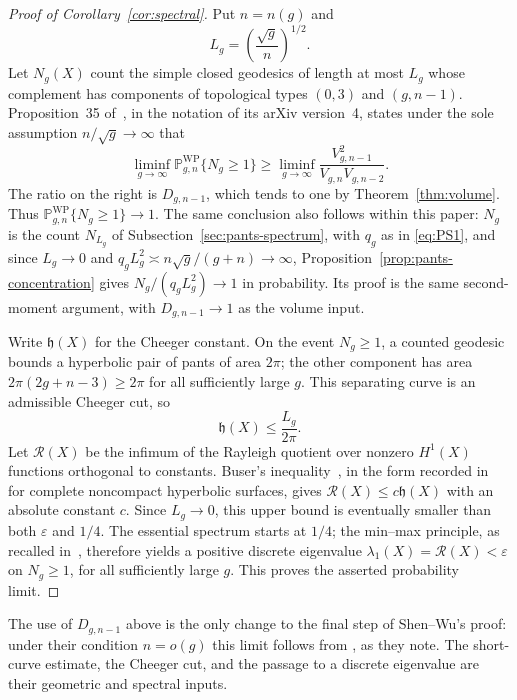 \begin{proof}[Proof of Corollary~\ref{cor:spectral}]
Put $n=n(g)$ and
\[
 L_g=\left(\frac{\sqrt g}{n}\right)^{1/2}.
\]
Let $N_g(X)$ count the simple closed geodesics of length at most $L_g$ whose complement has components of topological types $(0,3)$ and $(g,n-1)$. Proposition~35 of~\cite{SW}, in the notation of its arXiv version~4, states under the sole assumption $n/\sqrt g\to\infty$ that
\[
 \liminf_{g\to\infty}\mathbb P^{\mathrm{WP}}_{g,n}\{N_g\ge1\}
 \ge \liminf_{g\to\infty}
 \frac{V_{g,n-1}^{2}}{V_{g,n}V_{g,n-2}}.
\]
The ratio on the right is $D_{g,n-1}$, which tends to one by Theorem~\ref{thm:volume}. Thus $\mathbb P^{\mathrm{WP}}_{g,n}\{N_g\ge1\}\to1$. The same conclusion also follows within this paper: $N_g$ is the count $N_{L_g}$ of Subsection~\ref{sec:pants-spectrum}, with $q_g$ as in \eqref{eq:PS1}, and since $L_g\to0$ and $q_gL_g^2\asymp n\sqrt g/(g+n)\to\infty$, Proposition~\ref{prop:pants-concentration} gives $N_g/(q_gL_g^2)\to1$ in probability. Its proof is the same second-moment argument, with $D_{g,n-1}\to1$ as the volume input.

Write $\mathfrak h(X)$ for the Cheeger constant. On the event $N_g\ge1$, a counted geodesic bounds a hyperbolic pair of pants of area $2\pi$; the other component has area $2\pi(2g+n-3)\ge2\pi$ for all sufficiently large $g$. This separating curve is an admissible Cheeger cut, so
\[
 \mathfrak h(X)\le \frac{L_g}{2\pi}.
\]
Let $\mathcal R(X)$ be the infimum of the Rayleigh quotient over nonzero $H^1(X)$ functions orthogonal to constants. Buser's inequality~\cite[Theorem~7.1]{Buser}, in the form recorded in~\cite[Theorem~11]{SW} for complete noncompact hyperbolic surfaces, gives $\mathcal R(X)\le c\mathfrak h(X)$ with an absolute constant $c$. Since $L_g\to0$, this upper bound is eventually smaller than both $\varepsilon$ and $1/4$. The essential spectrum starts at $1/4$; the min--max principle, as recalled in~\cite[Theorem~7]{SW}, therefore yields a positive discrete eigenvalue $\lambda_1(X)=\mathcal R(X)<\varepsilon$ on $N_g\ge1$, for all sufficiently large $g$. This proves the asserted probability limit.
\end{proof}

The use of $D_{g,n-1}$ above is the only change to the final step of Shen--Wu's proof: under their condition $n=o(g)$ this limit follows from \cite[Lemma~5.1]{MZ}, as they note. The short-curve estimate, the Cheeger cut, and the passage to a discrete eigenvalue are their geometric and spectral inputs.






